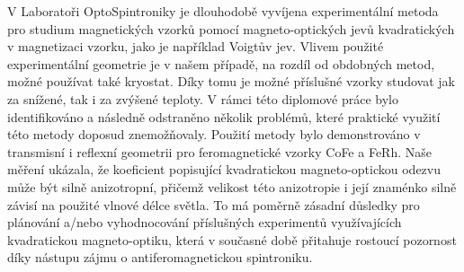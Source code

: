 \documentclass[12pt]{report}
\begin{document}
V Laboratoři OptoSpintroniky je dlouhodobě vyvíjena experimentální metoda pro studium magnetických vzorků pomocí magneto-optických jevů kvadratických v magnetizaci vzorku, jako je například Voigtův jev.
Vlivem použité experimentální geometrie je v našem případě, na rozdíl od obdobných metod, možné používat také kryostat.
Díky tomu je možné příslušné vzorky studovat jak za snížené, tak i za zvýšené teploty.
V rámci této diplomové práce bylo identifikováno a následně odstraněno několik problémů, které praktické využití této metody doposud znemožňovaly.
Použití metody bylo demonstrováno v transmisní i reflexní geometrii pro feromagnetické vzorky CoFe a FeRh.
Naše měření ukázala, že koeficient popisující kvadratickou magneto-optickou odezvu může být silně anizotropní, přičemž velikost této anizotropie i její znaménko silně závisí na použité vlnové délce světla.
To má poměrně zásadní důsledky pro plánování a/nebo vyhodnocování příslušných experimentů využívajících kvadratickou magneto-optiku, která v současné době přitahuje rostoucí pozornost díky nástupu zájmu o antiferomagnetickou spintroniku.
\end{document}
